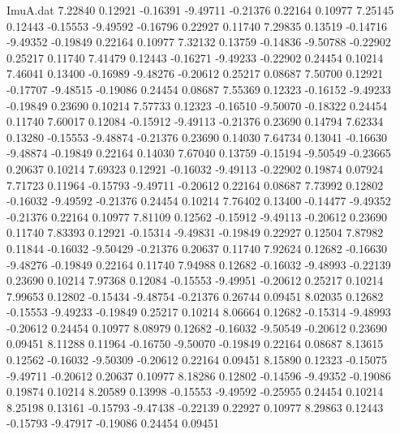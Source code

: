\begin{filecontents}{ImuA.dat}
   7.22840    0.12921   -0.16391   -9.49711   -0.21376    0.22164    0.10977
   7.25145    0.12443   -0.15553   -9.49592   -0.16796    0.22927    0.11740
   7.29835    0.13519   -0.14716   -9.49352   -0.19849    0.22164    0.10977
   7.32132    0.13759   -0.14836   -9.50788   -0.22902    0.25217    0.11740
   7.41479    0.12443   -0.16271   -9.49233   -0.22902    0.24454    0.10214
   7.46041    0.13400   -0.16989   -9.48276   -0.20612    0.25217    0.08687
   7.50700    0.12921   -0.17707   -9.48515   -0.19086    0.24454    0.08687
   7.55369    0.12323   -0.16152   -9.49233   -0.19849    0.23690    0.10214
   7.57733    0.12323   -0.16510   -9.50070   -0.18322    0.24454    0.11740
   7.60017    0.12084   -0.15912   -9.49113   -0.21376    0.23690    0.14794
   7.62334    0.13280   -0.15553   -9.48874   -0.21376    0.23690    0.14030
   7.64734    0.13041   -0.16630   -9.48874   -0.19849    0.22164    0.14030
   7.67040    0.13759   -0.15194   -9.50549   -0.23665    0.20637    0.10214
   7.69323    0.12921   -0.16032   -9.49113   -0.22902    0.19874    0.07924
   7.71723    0.11964   -0.15793   -9.49711   -0.20612    0.22164    0.08687
   7.73992    0.12802   -0.16032   -9.49592   -0.21376    0.24454    0.10214
   7.76402    0.13400   -0.14477   -9.49352   -0.21376    0.22164    0.10977
   7.81109    0.12562   -0.15912   -9.49113   -0.20612    0.23690    0.11740
   7.83393    0.12921   -0.15314   -9.49831   -0.19849    0.22927    0.12504
   7.87982    0.11844   -0.16032   -9.50429   -0.21376    0.20637    0.11740
   7.92624    0.12682   -0.16630   -9.48276   -0.19849    0.22164    0.11740
   7.94988    0.12682   -0.16032   -9.48993   -0.22139    0.23690    0.10214
   7.97368    0.12084   -0.15553   -9.49951   -0.20612    0.25217    0.10214
   7.99653    0.12802   -0.15434   -9.48754   -0.21376    0.26744    0.09451
   8.02035    0.12682   -0.15553   -9.49233   -0.19849    0.25217    0.10214
   8.06664    0.12682   -0.15314   -9.48993   -0.20612    0.24454    0.10977
   8.08979    0.12682   -0.16032   -9.50549   -0.20612    0.23690    0.09451
   8.11288    0.11964   -0.16750   -9.50070   -0.19849    0.22164    0.08687
   8.13615    0.12562   -0.16032   -9.50309   -0.20612    0.22164    0.09451
   8.15890    0.12323   -0.15075   -9.49711   -0.20612    0.20637    0.10977
   8.18286    0.12802   -0.14596   -9.49352   -0.19086    0.19874    0.10214
   8.20589    0.13998   -0.15553   -9.49592   -0.25955    0.24454    0.10214
   8.25198    0.13161   -0.15793   -9.47438   -0.22139    0.22927    0.10977
   8.29863    0.12443   -0.15793   -9.47917   -0.19086    0.24454    0.09451

\end{filecontents}
